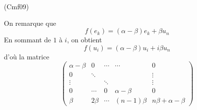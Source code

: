 \begin{tiny}(Cmf09)\end{tiny} On remarque que
\begin{displaymath}
  f(e_k) = (\alpha - \beta)e_k + \beta u_n
\end{displaymath}
En sommant de $1$ à $i$, on obtient
\begin{displaymath}
  f(u_i) = (\alpha - \beta)u_i + i \beta u_n
\end{displaymath}
d'où la matrice
\begin{displaymath}
\begin{pmatrix}
  \alpha - \beta & 0      & \cdots &    \cdots       & 0 \\
  0              & \ddots &        &                &  \vdots \\
  \vdots         &        & \ddots &                &  \vdots \\
  0              & \cdots & 0      & \alpha - \beta &  0 \\
  \beta          & 2\beta & \cdots & (n-1)\beta     & n\beta + \alpha - \beta
\end{pmatrix}  
\end{displaymath}
